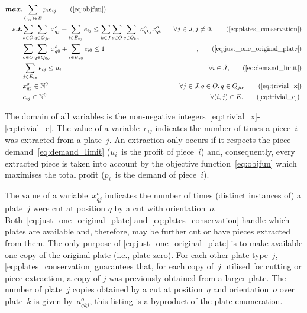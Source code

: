 \begin{align*}
\bm{max.} &\sum_{(i, j) \in E} p_i e_{ij} \tag{\ref{eq:objfun}}\\
\bm{s.t.} &\specialcell{\sum_{o \in O}\sum_{q \in Q_{jo}} x^o_{qj} + \sum_{i \in E_{*j}} e_{ij} \leq \sum_{k \in J}\sum_{o \in O}\sum_{q \in Q_{ko}} a^o_{qkj} x^o_{qk} \hspace*{0.05\textwidth} \forall j \in J, j \neq 0,}\tag{\ref{eq:plates_conservation}}\\
	    & \specialcell{\sum_{o \in O}\sum_{q \in Q_{0o}} x^o_{q0} + \sum_{i \in E_{*0}} e_{i0} \leq 1 \hspace*{\fill},}\tag{\ref{eq:just_one_original_plate}}\\
            & \specialcell{\sum_{j \in E_{i*}} e_{ij} \leq u_i \hspace*{\fill} \forall i \in \bar{J},}\tag{\ref{eq:demand_limit}}\\
	    & \specialcell{x^o_{qj} \in \mathbb{N}^0 \hspace*{\fill} \forall j \in J, o \in O, q \in Q_{jo},}\tag{\ref{eq:trivial_x}}\\
            & \specialcell{e_{ij} \in \mathbb{N}^0 \hspace*{\fill} \forall (i, j) \in E.}\tag{\ref{eq:trivial_e}}
\end{align*}

The domain of all variables is the non-negative integers~\eqref{eq:trivial_x}-\eqref{eq:trivial_e}.
The value of a variable~\(e_{ij}\) indicates the number of times a piece~\(i\) was extracted from a  plate~\(j\).
An extraction only occurs if it respects the piece demand~\eqref{eq:demand_limit} (\(u_i\)~is the profit of piece~\(i\)) and, consequently, every extracted piece is taken into account by the objective function~\eqref{eq:objfun} which maximises the total profit (\(p_i\)~is the demand of piece~\(i\)).

The value of a variable~\(x^o_{qj}\) indicates the number of times (distinct instances of) a plate~\(j\) were cut at position \(q\) by a cut with orientation~\(o\).
Both~\eqref{eq:just_one_original_plate} and~\eqref{eq:plates_conservation} handle which plates are available and, therefore, may be further cut or have pieces extracted from them.
The only purpose of \eqref{eq:just_one_original_plate} is to make available one copy of the original plate (i.e., plate zero).
For each other plate type~\(j\), \eqref{eq:plates_conservation} guarantees that, for each copy of~\(j\) utilised for cutting or piece extraction, a copy of \(j\) was previously obtained from a larger plate.
The number of plate~\(j\) copies obtained by a cut at position~\(q\) and orientation~\(o\) over plate~\(k\) is given by~\(a^o_{qkj}\), this listing is a byproduct of the plate enumeration.

